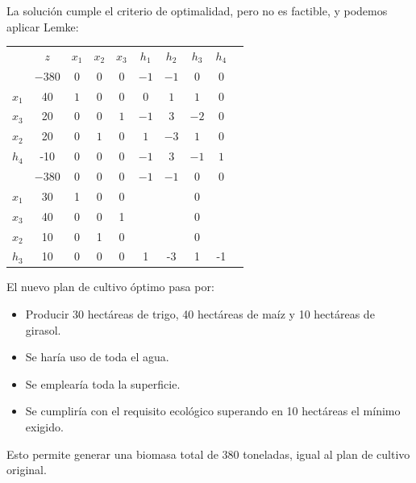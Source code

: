 \begin{enumerate}[label=\alph*)]
    La solución cumple el criterio de optimalidad, pero no es factible, y podemos aplicar Lemke:

    \begin{center}
    \begin{tabular}{c|c|cccccccc|}
     & $z$ & $x_1$ & $x_2$ & $x_3$ & $h_1$ & $h_2$ & $h_3$ & $h_4$\\ 
          & $-380$ & $0$ & $0$ & $0$ & $-1$ & $-1$ & $0$ & $0$ \\ 
    \hline
    $x_1$ & 40  & $1$ & $0$ & $0$ & $0$ & $1$ & $1$ & $0$\\ 
    $x_3$ & 20  & $0$ & $0$ & $1$ & $-1$ & $3$ & $-2$ & $0$\\ 
    $x_2$ & 20  & $0$ & $1$ & $0$ & $1$ & $-3$ & $1$ & $0$\\
    $h_4$ & -10  & $0$ & $0$ & $0$ & $-1$ & $3$ & $-1$ & $1$\\
    \hline
          & $-380$ & $0$ & $0$ & $0$ & $-1$ & $-1$ & $0$ & $0$ \\ 
    \hline
    $x_1$ & 30  &  1 & 0 & 0 &   &  & 0   & \\ 
    $x_3$ & 40  &  0 & 0 & 1 &   &  & 0   & \\  
    $x_2$ & 10  &  0 & 1 & 0 &   &  & 0   & \\ 
    $h_3$ & 10  &  0 & 0 & 0 & 1 & -3 & 1 & -1\\ 
    \hline
    \end{tabular}
    \end{center}

    El nuevo plan de cultivo óptimo pasa por:
    \begin{itemize}
        \item Producir 30 hectáreas de trigo, 40 hectáreas de maíz y 10 hectáreas de girasol.
        \item Se haría uso de toda el agua.
        \item Se emplearía toda la superficie.
        \item Se cumpliría con el requisito ecológico superando en 10 hectáreas el mínimo exigido.
    \end{itemize}
    Esto permite generar una biomasa total de 380 toneladas, igual al plan de cultivo original.


    
\end{enumerate}